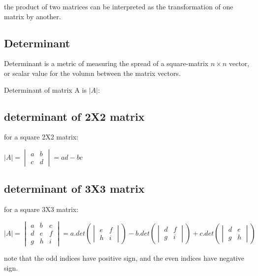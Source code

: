 \documentclass[4apaper,12pt]{book}
\begin{document}
\begin{description}
\begin{description}
        \item the product of two matrices can be interpreted as the transformation of one matrix by another.
      \end{description}
      \subsection{Determinant}
    \item Determinant is a metric of measuring the spread of a square-matrix $n\times n$ vector, or scalar value for the volumn between the matrix vectors.
    \item Determinant of matrix A is $\left|A\right|$:
      \subsection{determinant of 2X2 matrix}
    \item for a square 2X2 matrix:
    \item $\left|A\right| = \begin{vmatrix}a&b\\c&d\end{vmatrix} = ad-bc$
      \subsection{determinant of 3X3 matrix}
    \item  for a square 3X3 matrix:
    \item $\left|A\right| = \begin{vmatrix}a&b&c\\d&e&f\\g&h&i\end{vmatrix} = a.det(\begin{vmatrix}e&f\\h&i\end{vmatrix}) - b.det(\begin{vmatrix}d&f\\g&i\end{vmatrix}) + c.det(\begin{vmatrix}d&e\\g&h\end{vmatrix})$
          \item note that the odd indices have positive sign, and the even indices have negative sign.

\end{description}
\end{document}
